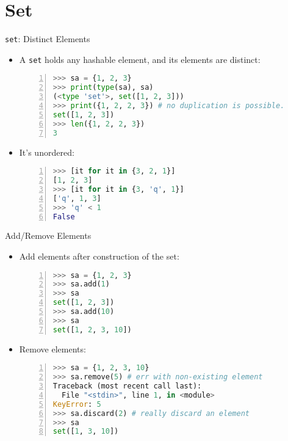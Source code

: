 \documentclass[dvips,xcolor=pst,14pt]{beamer}
\begin{document}
\section{
Set
}

\begin{frame}[fragile]{
%
\texttt{set}: Distinct Elements
%
}
\begin{itemize}
\item A \texttt{set} holds any hashable element, and its elements are distinct:
  \begin{lstlisting}[basicstyle=\scriptsize\ttfamily,numbers=left,language=Python]
>>> sa = {1, 2, 3}
>>> print(type(sa), sa)
(<type 'set'>, set([1, 2, 3]))
>>> print({1, 2, 2, 3}) # no duplication is possible.
set([1, 2, 3])
>>> len({1, 2, 2, 3})
3
  \end{lstlisting}
\item It's unordered:
  \begin{lstlisting}[basicstyle=\scriptsize\ttfamily,numbers=left,language=Python]
>>> [it for it in {3, 2, 1}]
[1, 2, 3]
>>> [it for it in {3, 'q', 1}]
['q', 1, 3]
>>> 'q' < 1
False
  \end{lstlisting}
\end{itemize}
\end{frame}

\begin{frame}[fragile]{
%
Add/Remove Elements
%
}
\begin{itemize}
\item Add elements after construction of the set:
  \begin{lstlisting}[basicstyle=\scriptsize\ttfamily,numbers=left,language=Python]
>>> sa = {1, 2, 3}
>>> sa.add(1)
>>> sa
set([1, 2, 3])
>>> sa.add(10)
>>> sa
set([1, 2, 3, 10])
  \end{lstlisting}
\item Remove elements:
  \begin{lstlisting}[basicstyle=\scriptsize\ttfamily,numbers=left,language=Python]
>>> sa = {1, 2, 3, 10}
>>> sa.remove(5) # err with non-existing element
Traceback (most recent call last):
  File "<stdin>", line 1, in <module>
KeyError: 5
>>> sa.discard(2) # really discard an element
>>> sa
set([1, 3, 10])
  \end{lstlisting}
\end{itemize}
\end{frame}
\end{document}
